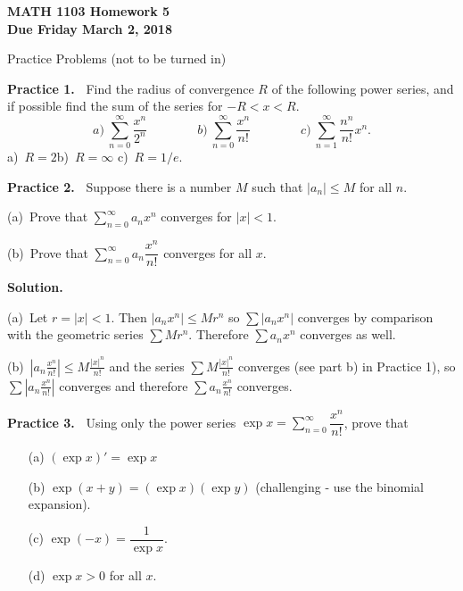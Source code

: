 \documentclass[12pt]{article}
\theoremstyle{definition}
\theoremstyle{remark}
\theoremstyle{definition}
\newenvironment{Solution}{\noindent\textbf{Solution.}}{}
\begin{document}
  

{\bf MATH 1103 Homework 5}\\
{\bf Due Friday March 2, 2018}

Practice Problems (not to be turned in)

{\bf Practice 1.\ } Find the radius of convergence $R$ of the following power series, and if possible find the sum of the series for $-R<x<R$. 
\[a)\ \sum\limits_{n=0}^\infty \frac{x^n}{2^n}\qquad\qquad
b)\ \sum\limits_{n=0}^\infty \frac{x^n}{n!}\qquad\qquad
c)\ \sum\limits_{n=1}^\infty \frac{n^n}{n!}x^n.
\]
a)\ $R=2$\quad b)\ $R=\infty$ \quad c)\ $R=1/e$.

{\bf Practice 2.\ } Suppose there is a number $M$ such that  $|a_n|\leq M$ for all $n$. 

(a)\ Prove that $\sum\limits_{n=0}^\infty a_n x^n$ converges for $|x|<1$.

(b)\ Prove that $\sum\limits_{n=0}^\infty a_n \dfrac{x^n}{n!}$ converges for all $x$. 

\begin{Solution}

(a)\ Let $r=|x|<1$. Then $|a_n x^n|\leq Mr^n$ so $\sum |a_nx^n| $ converges by comparison with the geometric series $\sum Mr^n$. Therefore $\sum a_nx^n$ converges as well. 

(b)\ $|a_n \frac{x^n}{n!}|\leq M\frac{|x|^n}{n!}$ and the series $\sum M\frac{|x|^n}{n!}$ converges (see part b) in Practice 1), so $\sum|a_n \frac{x^n}{n!}|$ converges and therefore $\sum a_n \frac{x^n}{n!}$ converges. 

\end{Solution}
{\bf Practice 3.\ } Using only the power series $\exp x=\sum\limits_{n=0}^\infty\dfrac{x^n}{n!}$, prove that 
\begin{enumerate}
\item[(a)] $(\exp x)'=\exp x$
\item[(b)] $\exp (x+y)=(\exp x)(\exp y)$ (challenging - use the binomial expansion). 
\item[(c)] $\exp(-x)=\dfrac{1}{\exp x}$.
\item[(d)] $\exp x>0$ for all $x$. 
\end{enumerate}
\end{document}
